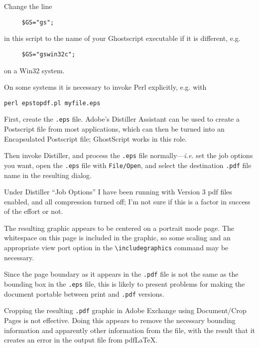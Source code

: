 \documentclass{article}
\begin{document}
  Change the line\par
\begin{verbatim}
     $GS="gs";
\end{verbatim}
  in this script to the name of your Ghostscript executable if it is
  different, e.g.\par
\begin{verbatim}
     $GS="gswin32c";
\end{verbatim}
  on a Win32 system.

  On some systems it is necessary to invoke Perl explicitly, e.g.
  with\par
\begin{verbatim}
perl epstopdf.pl myfile.eps
\end{verbatim}


First, create the \texttt{.eps} file.  Adobe's Distiller Assistant can
be used to create a Postscript file from most applications, which can
then be turned into an Encapsulated Postscript file; GhostScript works
in this role.

Then invoke Distiller, and process the \texttt{.eps} file
normally---\textit{i.e.} set the job options you want, open the
\texttt{.eps} file with \texttt{File/Open}, and select the destination
\texttt{.pdf} file name in the resulting dialog.

Under Distiller ``Job Options'' I have been running with Version 3 pdf
files enabled, and all compression turned off; I'm not sure if this is
a factor in success of the effort or not.

The resulting graphic appears to be centered on a portrait mode page.
The whitespace on this page is included in the graphic, so some
scaling and an appropriate view port option in the
\verb+\includegraphics+ command may be necessary.

Since the page boundary as it appears in the \texttt{.pdf} file is not
the same as the bounding box in the \texttt{.eps} file, this is likely
to present problems for making the document portable between print and
\texttt{.pdf} versions.

Cropping the resulting \texttt{.pdf} graphic in Adobe Exchange using
Document/Crop Pages is not effective.  Doing this appears to remove
the necessary bounding information and apparently other information
from the file, with the result that it creates an error in the output
file from pdf\LaTeX.
\end{document}

